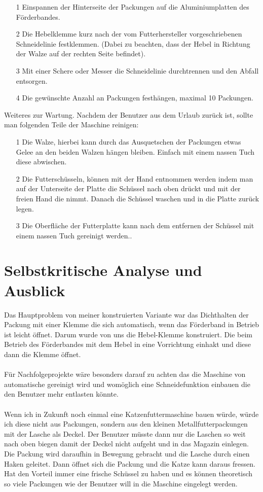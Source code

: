 \begin{itemize}
\item[1] Einspannen der Hinterseite der Packungen auf die Aluminiumplatten des Förderbandes. 
\item[2] Die Hebelklemme kurz nach der vom Futterhersteller vorgeschriebenen Schneidelinie festklemmen. (Dabei zu beachten, dass der Hebel in Richtung der Walze auf der rechten Seite befindet).
\item[3] Mit einer Schere oder Messer die Schneidelinie durchtrennen und den Abfall entsorgen.
\item[4] Die gewünschte Anzahl an Packungen festhängen, maximal 10 Packungen.
\end{itemize} 

Weiteres zur Wartung. Nachdem der Benutzer aus dem Urlaub zurück ist, sollte man folgenden Teile der Maschine reinigen: 

\begin{itemize}
\item[1] Die Walze, hierbei kann durch das Ausquetschen der Packungen etwas Gelee an den beiden Walzen hängen bleiben. Einfach mit einem nassen Tuch diese abwischen.
\item[2] Die Futterschüsseln, können mit der Hand entnommen werden indem man auf der Unterseite der Platte die Schüssel nach oben drückt und mit der freien Hand die nimmt. Danach die Schüssel waschen und in die Platte zurück legen.
\item[3] Die Oberfläche der Futterplatte kann nach dem entfernen der Schüssel mit einem nassen Tuch gereinigt werden..
\end{itemize}


\section{Selbstkritische Analyse und Ausblick}

Das Hauptproblem von meiner konstruierten Variante war das Dichthalten der Packung mit einer Klemme die sich automatisch, wenn das Förderband in Betrieb ist leicht öffnet. Darum wurde von uns die Hebel-Klemme konstruiert. Die beim Betrieb des Förderbandes mit dem Hebel in eine Vorrichtung einhakt und diese dann die Klemme öffnet. \\
\\
Für Nachfolgeprojekte wäre besonders darauf zu achten das die Maschine von automatische gereinigt wird und womöglich eine Schneidefunktion einbauen die den Benutzer mehr entlasten könnte.\\
\\
Wenn ich in Zukunft noch einmal eine Katzenfuttermaschine bauen würde, würde ich diese nicht aus Packungen, sondern aus den kleinen Metallfutterpackungen mit der Lasche als Deckel. Der Benutzer müsste dann nur die Laschen so weit nach oben biegen damit der Deckel nicht aufgeht und in das Magazin einlegen. Die Packung wird daraufhin in Bewegung gebracht und die Lasche durch einen Haken geleitet. Dann öffnet sich die Packung und die Katze kann daraus fressen. Hat den Vorteil immer eine frische Schüssel zu haben und es können theoretisch so viele Packungen wie der Benutzer will in die Maschine eingelegt werden. \\
 
